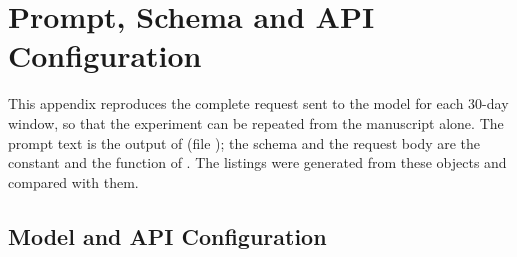 \section{Prompt, Schema and API Configuration}
\label{app:prompt}

This appendix reproduces the complete request sent to the model for each 30-day window, so that the experiment can be repeated from the manuscript alone. The prompt text is the output of  (file ); the schema and the request body are the constant  and the function  of . The listings were generated from these objects and compared with them.

\subsection{Model and API Configuration}
\label{app:prompt:config}

